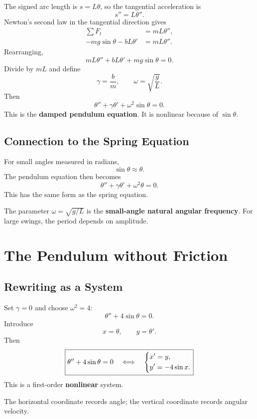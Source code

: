 \documentclass[11pt,letterpaper]{article}
\begin{document}
The signed arc length is $s=L\theta$, so the
tangential acceleration is
\[
s''=L\theta''.
\]
Newton's second law in the tangential direction gives
\begin{align*}
\sum F_t&=mL\theta'',\\
-mg\sin\theta-bL\theta'&=mL\theta''.
\end{align*}
Rearranging,
\[
mL\theta''+bL\theta'+mg\sin\theta=0.
\]
Divide by $mL$ and define
\[
\gamma=\frac{b}{m},
\qquad
\omega=\sqrt{\frac{g}{L}}.
\]
Then
\[
\boxed{
\theta''+\gamma\theta'+\omega^2\sin\theta=0.
}
\]
This is the \textbf{damped pendulum equation}.
It is nonlinear because of $\sin\theta$.

\subsection{Connection to the Spring Equation}

For small angles measured in radians,
\[
\sin\theta\approx\theta.
\]
The pendulum equation then becomes
\[
\theta''+\gamma\theta'+\omega^2\theta=0.
\]
This has the same form as the spring equation.

The parameter $\omega=\sqrt{g/L}$ is the
\textbf{small-angle natural angular frequency}.
For large swings, the period depends on amplitude.

\section{The Pendulum without Friction}

\subsection{Rewriting as a System}

Set $\gamma=0$ and choose $\omega^2=4$:
\[
\theta''+4\sin\theta=0.
\]
Introduce
\[
x=\theta,\qquad y=\theta'.
\]
Then
\[
\boxed{
\theta''+4\sin\theta=0
\quad\Longleftrightarrow\quad
\begin{dcases}
x'=y,\\
y'=-4\sin x.
\end{dcases}
}
\]
This is a first-order \textbf{nonlinear} system.

The horizontal coordinate records angle; the vertical
coordinate records angular velocity.

\end{document}
